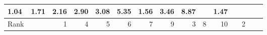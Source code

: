 \begin{tabular}{ll|rrrrrr|rrrrrrr}
  


  
  \textbf{1.04} & 1.71 & 2.16 & 2.90 & 3.08 & 5.35 & 1.56 & 3.46 & 8.87 &  & 1.47 \\\hline\hline

  Rank & &
  1 & 4 & 5 & 6 & 7 & 9 & 3 & 8 & 10 &  & 2 \\
  

\end{tabular}
